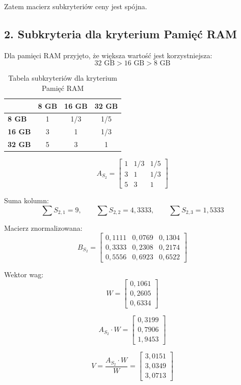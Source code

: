 \documentclass[12pt,a4paper]{article}
\begin{document}
Zatem macierz subkryteriów ceny jest spójna.

\subsection*{2. Subkryteria dla kryterium Pamięć RAM}

Dla pamięci RAM przyjęto, że większa wartość jest korzystniejsza:
\[
32\text{ GB} > 16\text{ GB} > 8\text{ GB}
\]

\begin{table}[H]
\centering
\caption{Tabela subkryteriów dla kryterium Pamięć RAM}
\begin{tabular}{lccc}
\toprule
 & \textbf{8 GB} & \textbf{16 GB} & \textbf{32 GB} \\
\midrule
\textbf{8 GB} & 1 & 1/3 & 1/5 \\
\textbf{16 GB} & 3 & 1 & 1/3 \\
\textbf{32 GB} & 5 & 3 & 1 \\
\bottomrule
\end{tabular}
\end{table}

\[
A_{S_2}=
\begin{bmatrix}
1 & 1/3 & 1/5 \\
3 & 1 & 1/3 \\
5 & 3 & 1
\end{bmatrix}
\]

Suma kolumn:
\[
\sum S_{2,1}=9,\qquad \sum S_{2,2}=4{,}3333,\qquad \sum S_{2,3}=1{,}5333
\]

Macierz znormalizowana:
\[
B_{S_2}=
\begin{bmatrix}
0{,}1111 & 0{,}0769 & 0{,}1304 \\
0{,}3333 & 0{,}2308 & 0{,}2174 \\
0{,}5556 & 0{,}6923 & 0{,}6522
\end{bmatrix}
\]

Wektor wag:
\[
W=
\begin{bmatrix}
0{,}1061\\
0{,}2605\\
0{,}6334
\end{bmatrix}
\]

\[
A_{S_2}\cdot W=
\begin{bmatrix}
0{,}3199\\
0{,}7906\\
1{,}9453
\end{bmatrix}
\]

\[
V=
\frac{A_{S_2}\cdot W}{W}
=
\begin{bmatrix}
3{,}0151\\
3{,}0349\\
3{,}0713
\end{bmatrix}
\]
\end{document}
